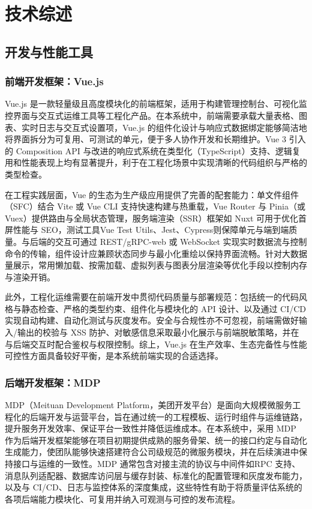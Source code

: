 \chapter{技术综述}
\section{开发与性能工具}
\subsection{前端开发框架：Vue.js}
Vue.js 是一款轻量级且高度模块化的前端框架，适用于构建管理控制台、可视化监控界面与交互式运维工具等工程化产品\cite{filipova2016learning}。在本系统中，前端需要承载大量表格、图表、实时日志与交互式设置项，Vue.js 的组件化设计与响应式数据绑定能够简洁地将界面拆分为可复用、可测试的单元\cite{Ollila_Mäkitalo_Mikkonen_2022}，便于多人协作开发和长期维护。Vue 3 引入的 Composition API 与改进的响应式系统在类型化（TypeScript）支持、逻辑复用和性能表现上均有显著提升，利于在工程化场景中实现清晰的代码组织与严格的类型检查。

在工程实践层面，Vue 的生态为生产级应用提供了完善的配套能力：单文件组件（SFC）结合 Vite 或 Vue CLI 支持快速构建与热重载，Vue Router 与 Pinia（或 Vuex）提供路由与全局状态管理，服务端渲染（SSR）框架如 Nuxt 可用于优化首屏性能与 SEO，测试工具Vue Test Utils、Jest、Cypress则保障单元与端到端质量。与后端的交互可通过 REST/gRPC-web 或 WebSocket 实现实时数据流与控制命令的传输，组件设计应兼顾状态同步与最小化重绘以保持界面流畅。针对大数据量展示，常用懒加载、按需加载、虚拟列表与图表分层渲染等优化手段以控制内存与渲染开销。

此外，工程化运维需要在前端开发中贯彻代码质量与部署规范：包括统一的代码风格与静态检查、严格的类型约束、组件化与模块化的 API 设计、以及通过 CI/CD 实现自动构建、自动化测试与灰度发布。安全与合规性亦不可忽视，前端需做好输入/输出的校验与 XSS 防护、对敏感信息采取最小化展示与前端脱敏策略，并在与后端交互时配合鉴权与权限控制。综上，Vue.js 在生产效率、生态完备性与性能可控性方面具备较好平衡，是本系统前端实现的合适选择。
\subsection{后端开发框架：MDP}
MDP（Meituan Development Platform，美团开发平台）是面向大规模微服务工程化的后端开发与运营平台，旨在通过统一的工程模板、运行时组件与运维链路，提升服务开发效率、保证平台一致性并降低运维成本。在本系统中，采用 MDP 作为后端开发框架能够在项目初期提供成熟的服务骨架、统一的接口约定与自动化生成能力，使团队能够快速搭建符合公司级规范的微服务模块，并在后续演进中保持接口与运维的一致性。MDP 通常包含对接主流的协议与中间件如RPC 支持、消息队列适配器、数据库访问层与缓存封装、标准化的配置管理和灰度发布能力，以及与 CI/CD、日志与监控体系的深度集成，这些特性有助于将质量评估系统的各项后端能力模块化、可复用并纳入可观测与可控的发布流程。

